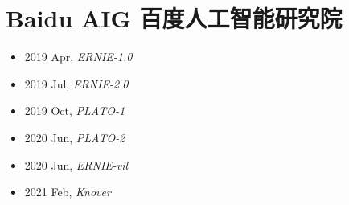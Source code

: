 \section{Baidu AIG 百度人工智能研究院}\label{com:Baidu AIG}

\begin{itemize}
    \item 2019 Apr, \textit{ERNIE-1.0}\cite{ERNIE-1.0}
    \item 2019 Jul, \textit{ERNIE-2.0}\cite{ERNIE-2.0}
    \item 2019 Oct, \textit{PLATO-1}\cite{PLATO-1}
    \item 2020 Jun, \textit{PLATO-2}\cite{PLATO-2}
    \item 2020 Jun, \textit{ERNIE-vil}\cite{ERNIE-vil}
    \item 2021 Feb, \textit{Knover}\cite{Knover}
\end{itemize}